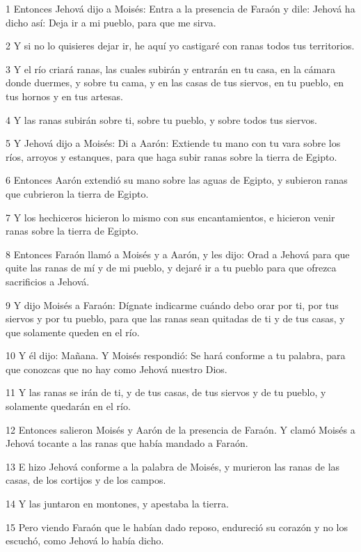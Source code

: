 \par 1 Entonces Jehová dijo a Moisés: Entra a la presencia de Faraón y dile: Jehová ha dicho así: Deja ir a mi pueblo, para que me sirva.
\par 2 Y si no lo quisieres dejar ir, he aquí yo castigaré con ranas todos tus territorios.
\par 3 Y el río criará ranas, las cuales subirán y entrarán en tu casa, en la cámara donde duermes, y sobre tu cama, y en las casas de tus siervos, en tu pueblo, en tus hornos y en tus artesas.
\par 4 Y las ranas subirán sobre ti, sobre tu pueblo, y sobre todos tus siervos.
\par 5 Y Jehová dijo a Moisés: Di a Aarón: Extiende tu mano con tu vara sobre los ríos, arroyos y estanques, para que haga subir ranas sobre la tierra de Egipto.
\par 6 Entonces Aarón extendió su mano sobre las aguas de Egipto, y subieron ranas que cubrieron la tierra de Egipto.
\par 7 Y los hechiceros hicieron lo mismo con sus encantamientos, e hicieron venir ranas sobre la tierra de Egipto.
\par 8 Entonces Faraón llamó a Moisés y a Aarón, y les dijo: Orad a Jehová para que quite las ranas de mí y de mi pueblo, y dejaré ir a tu pueblo para que ofrezca sacrificios a Jehová.
\par 9 Y dijo Moisés a Faraón: Dígnate indicarme cuándo debo orar por ti, por tus siervos y por tu pueblo, para que las ranas sean quitadas de ti y de tus casas, y que solamente queden en el río.
\par 10 Y él dijo: Mañana. Y Moisés respondió: Se hará conforme a tu palabra, para que conozcas que no hay como Jehová nuestro Dios.
\par 11 Y las ranas se irán de ti, y de tus casas, de tus siervos y de tu pueblo, y solamente quedarán en el río.
\par 12 Entonces salieron Moisés y Aarón de la presencia de Faraón. Y clamó Moisés a Jehová tocante a las ranas que había mandado a Faraón.
\par 13 E hizo Jehová conforme a la palabra de Moisés, y murieron las ranas de las casas, de los cortijos y de los campos.
\par 14 Y las juntaron en montones, y apestaba la tierra.
\par 15 Pero viendo Faraón que le habían dado reposo, endureció su corazón y no los escuchó, como Jehová lo había dicho.


